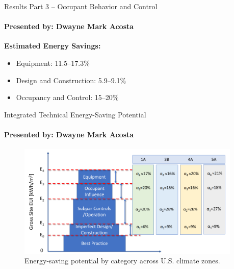 \documentclass{beamer}
\begin{document}
\begin{frame}{Results Part 3 – Occupant Behavior and Control}
    \framesubtitle{Presented by: Dwayne Mark Acosta}
    
    \scriptsize
    \begin{table}[h]
    \centering
    \caption{Occupant Behavior and Control Improvement Cases}
    \vspace{0.5em}
    \textbf{Estimated Energy Savings:}
    \begin{itemize}
        \item Equipment: 11.5--17.3\%
        \item Design and Construction: 5.9--9.1\%
        \item Occupancy and Control: 15--20\%
    \end{itemize}
    \end{table}
    \end{frame}


\begin{frame}{Integrated Technical Energy-Saving Potential}
    \framesubtitle{Presented by: Dwayne Mark Acosta}
    
    \begin{figure}
        \centering
        \includegraphics[width=0.95\textwidth]{figures/Integrated technical building energy-saving potential of a typical medium office building in the United States.png}
        \caption{Energy-saving potential by category across U.S. climate zones.}
        \label{fig:category-breakdown}
    \end{figure}
    \end{frame}
    
\end{document}

